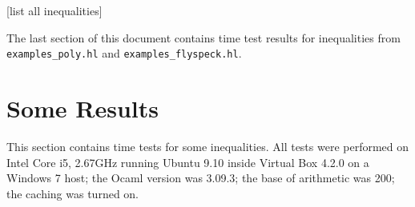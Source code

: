 \documentclass[a4paper]{article}
\begin{document}
[list all inequalities]

The last section of this document contains time test results for inequalities from \verb|examples_poly.hl| and \verb|examples_flyspeck.hl|.



\section{Some Results}
This section contains time tests for some inequalities. All tests were performed on Intel Core i5, 2.67GHz running Ubuntu 9.10 inside Virtual Box 4.2.0 on a Windows 7 host; the Ocaml version was 3.09.3; the base of arithmetic was 200; the caching was turned on.






\end{document}
